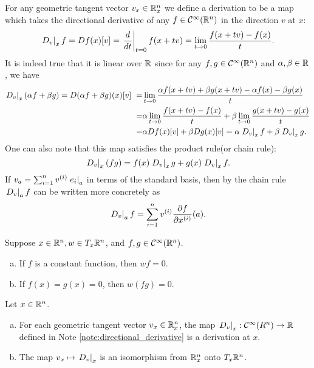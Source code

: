\documentclass[11pt,a4paper]{article}
\begin{document}
\begin{note}\label{note:directional_derivative}
For any geometric tangent vector $v_x\in \mathbb{R}^n_x$ we define a derivation to be a map which takes the directional derivative of any $f\in\mathcal{C}^\infty(\mathbb{R}^n)$ in the direction $v$ at $x$:
$$
\left.D_v\right|_{x} f = Df(x)[v] = \left.\dfrac{d}{dt}\right|_{t=0} f(x+tv) = 
\lim_{t\rightarrow 0} \dfrac{f(x+tv)-f(x)}{t}.
$$
It is indeed true that it is linear over $\mathbb{R}$ since for any $f, g\in \mathcal{C}^\infty(\mathbb{R}^n)$ and $\alpha,\beta\in\mathbb{R}$, we have 
\begin{align*}
\left.D_v\right|_{x}(\alpha f+\beta g) = D(\alpha f+\beta g)(x)[v] \
=& \lim_{t\rightarrow 0} \dfrac{\alpha f(x+tv)+\beta g(x+tv) - \alpha f(x)-\beta g(x)}{t} \\
=& \alpha \lim_{t\rightarrow 0} \dfrac{f(x+tv)- f(x)}{t} + \beta\lim_{t\rightarrow 0} \dfrac{g(x+tv) - g(x)}{t} \\
=& \alpha Df(x)[v]+\beta Dg(x)[v] 
= \alpha \left.D_v\right|_{x} f+ \beta\left.D_v\right|_{x} g.
\end{align*}
One can also note that this map satisfies the product rule(or chain rule):
$$ \left.D_v\right|_{x}(fg) = f(x)\left.D_v\right|_{x}g + g(x)\left.D_v\right|_{x}f. $$
If $v_a = \sum_{i=1}^n v^{(i)} \left.e_i\right|_{a}$ in terms of the standard basis, then by the chain rule $\left.D_v\right|_{a}f$ can be written more concretely as
$$
\left.D_v\right|_{a}f = \sum_{i=1}^n v^{(i)} \dfrac{\partial f}{\partial x^{(i)}}(a).
$$
\end{note}

\begin{lemma}
Suppose $x\in\mathbb{R}^n,w\in T_x\mathbb{R}^n$, and $f,g\in\mathcal{C}^\infty(\mathbb{R}^n)$.
\begin{enumerate}[(a)]
    \item If $f$ is a constant function, then $wf = 0$.
    \item If $f(x) = g(x) = 0$, then $w(fg) = 0$.
\end{enumerate}
\end{lemma}

\begin{prop}
Let $x\in \mathbb{R}^n$.
\begin{enumerate}[(a)]
    \item For each geometric tangent vector $v_x\in\mathbb{R}^n_x$, the map $\left.D_v\right|_{x}:\mathcal{C}^\infty(R^n)\rightarrow \mathbb{R}$ defined in Note \ref{note:directional_derivative} is a derivation at $x$.
    \item The map $v_x\mapsto \left.D_v\right|_{x}$ is an isomorphism from $\mathbb{R}^n_x$ onto $T_x\mathbb{R}^n$.
\end{enumerate}
\end{prop}
\end{document}
